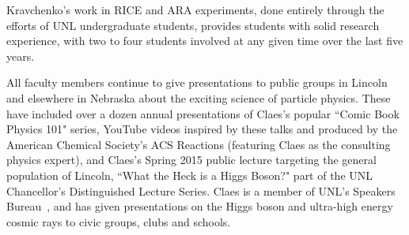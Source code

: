 Kravchenko's work in RICE and ARA experiments, done entirely through the efforts of UNL undergraduate students, provides students with solid research experience, with two to four students involved at any given time over the last five years.  


All faculty members continue to give presentations to public groups in Lincoln and elsewhere in Nebraska about the exciting science of particle physics. These have included over a dozen annual presentations of Claes's popular ``Comic Book Physics 101" series, YouTube videos inspired by these talks and produced by the American Chemical Society's ACS Reactions (featuring Claes as the consulting physics expert), and Claes's Spring 2015 public lecture targeting the general population of Lincoln, ``What the Heck is a Higgs Boson?" part of the UNL Chancellor's Distinguished Lecture Series.  
%
%
Claes is a member of UNL's Speakers Bureau~\cite{bib:speakers}, and has given presentations on the Higgs boson and ultra-high energy cosmic rays to civic groups, clubs and schools.